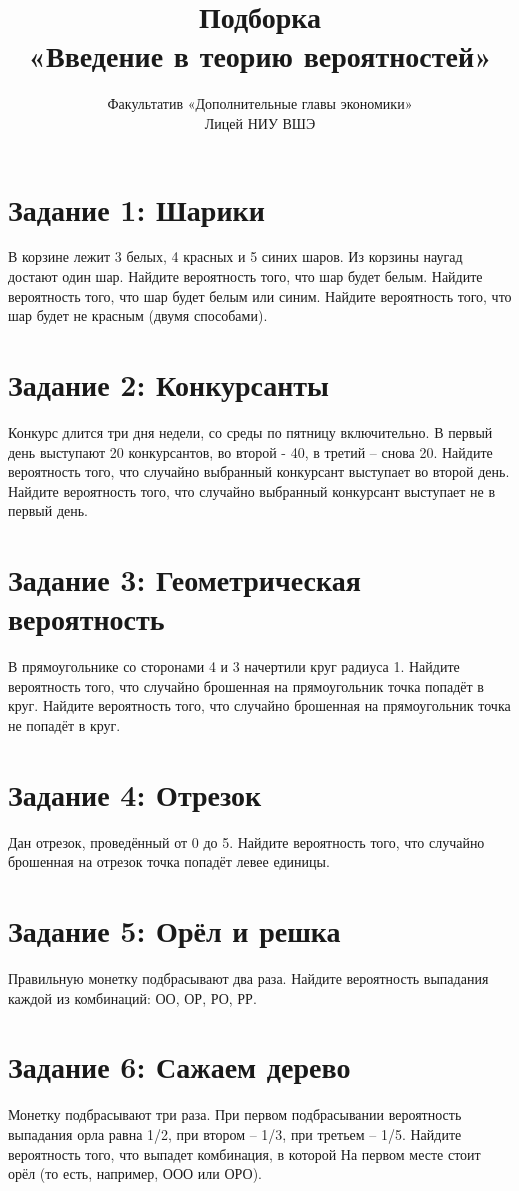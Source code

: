 \documentclass[10pt, a4paper]{extarticle}
\title{Подборка \\ «Введение в теорию вероятностей»}
\author{Факультатив «Дополнительные главы экономики» \\ Лицей НИУ ВШЭ}
\begin{document}
\maketitle

\section*{Задание 1: Шарики}
В корзине лежит 3 белых, 4 красных и 5 синих шаров. Из корзины наугад достают один шар. Найдите вероятность того, что шар будет белым. Найдите вероятность того, что шар будет белым или синим. Найдите вероятность того, что шар будет не красным (двумя способами). 

\section*{Задание 2: Конкурсанты}
Конкурс длится три дня недели, со среды по пятницу включительно. В первый день выступают 20 конкурсантов, во второй - 40, в третий – снова 20. Найдите вероятность того, что случайно выбранный конкурсант выступает во второй день. Найдите вероятность того, что случайно выбранный конкурсант выступает не в первый день. 

\section*{Задание 3: Геометрическая вероятность}
В прямоугольнике со сторонами 4 и 3 начертили круг радиуса 1. Найдите вероятность того, что случайно брошенная на прямоугольник точка попадёт в круг. Найдите вероятность того, что случайно брошенная на прямоугольник точка не попадёт в круг. 

\section*{Задание 4: Отрезок}
Дан отрезок, проведённый от 0 до 5. Найдите вероятность того, что случайно брошенная на отрезок точка попадёт левее единицы. 

\section*{Задание 5: Орёл и решка}
Правильную монетку подбрасывают два раза. Найдите вероятность выпадания каждой из комбинаций: ОО, ОР, РО, РР.

\section*{Задание 6: Сажаем дерево}
Монетку подбрасывают три раза. При первом подбрасывании вероятность выпадания орла равна 1/2, при втором – 1/3, при третьем – 1/5. Найдите вероятность того, что выпадет комбинация, в которой На первом месте стоит орёл (то есть, например, ООО или ОРО). 
\end{document}
